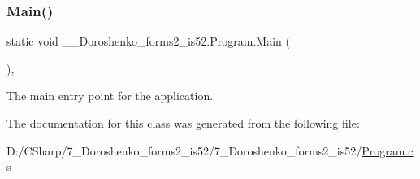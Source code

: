 \subsubsection{\texorpdfstring{Main()}{Main()}}
{\footnotesize\ttfamily static void \+\_\+\_\+\+Doroshenko\+\_\+forms2\+\_\+is52.\+Program.\+Main (\begin{DoxyParamCaption}{ }\end{DoxyParamCaption})\hspace{0.3cm}{\ttfamily [static]}, {\ttfamily [private]}}



The main entry point for the application. 



The documentation for this class was generated from the following file\+:\begin{DoxyCompactItemize}
\item 
D\+:/\+C\+Sharp/7\+\_\+\+Doroshenko\+\_\+forms2\+\_\+is52/7\+\_\+\+Doroshenko\+\_\+forms2\+\_\+is52/\hyperlink{_program_8cs}{Program.\+cs}\end{DoxyCompactItemize}
